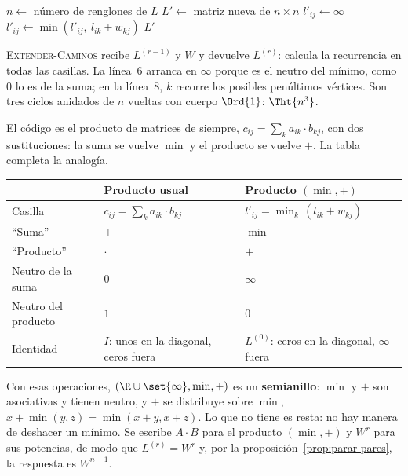 \documentclass[11pt,letterpaper]{article}
\begin{document}
\begin{algorithm}[H]
\caption{\textsc{Extender-Caminos}$(L, W)$}
\label{alg:extender-caminos}
\begin{algorithmic}[1]
  \State $n \gets$ número de renglones de $L$
  \State $L' \gets$ matriz nueva de $n \times n$
      \State $l'_{ij} \gets \infty$ 
        \State $l'_{ij} \gets \min(l'_{ij},\ l_{ik} + w_{kj})$
      \EndFor
    \EndFor
  \EndFor
  \State \Return $L'$
\EndProcedure
\end{algorithmic}
\end{algorithm}

\textsc{Extender-Caminos} recibe $L^{(r-1)}$ y $W$ y devuelve
$L^{(r)}$: calcula la recurrencia en todas las casillas. La línea~6
arranca en $\infty$ porque es el neutro del mínimo, como $0$ lo es de
la suma; en la línea~8, $k$ recorre los posibles penúltimos vértices.
Son tres ciclos anidados de $n$ vueltas con cuerpo $\Ord{1}$:
$\Tht{n^3}$.

El código es el producto de matrices de siempre,
$c_{ij} = \sum_k a_{ik} \cdot b_{kj}$, con dos sustituciones: la suma
se vuelve $\min$ y el producto se vuelve $+$. La tabla completa la
analogía.

\begin{center}
\small
\begin{tabular}{lll}
  \toprule
  & \textbf{Producto usual} & \textbf{Producto $(\min, +)$} \\
  \midrule
  Casilla & $c_{ij} = \sum_k a_{ik} \cdot b_{kj}$
          & $l'_{ij} = \min_k \, (l_{ik} + w_{kj})$ \\
  ``Suma'' & $+$ & $\min$ \\
  ``Producto'' & $\cdot$ & $+$ \\
  Neutro de la suma & $0$ & $\infty$ \\
  Neutro del producto & $1$ & $0$ \\
  Identidad & $I$: unos en la diagonal, ceros fuera
            & $L^{(0)}$: ceros en la diagonal, $\infty$ fuera \\
  \bottomrule
\end{tabular}
\end{center}

Con esas operaciones, $(\R \cup \set{\infty}, \min, +)$ es un
\textbf{semianillo}: $\min$ y $+$ son asociativas y tienen neutro, y
$+$ se distribuye sobre $\min$, $x + \min(y, z) = \min(x + y, x + z)$.
Lo que no tiene es resta: no hay manera de deshacer un mínimo. Se
escribe $A \cdot B$ para el producto $(\min, +)$ y $W^r$ para sus
potencias, de modo que $L^{(r)} = W^r$ y, por la
proposición~\ref{prop:parar-pares}, la respuesta es $W^{n-1}$.
\end{document}
